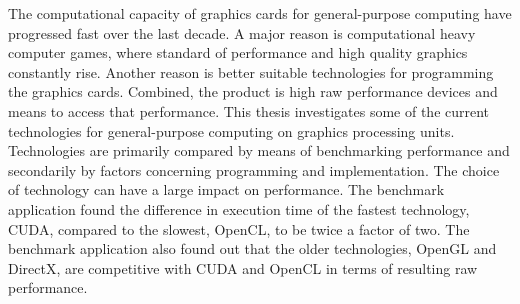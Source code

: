 The computational capacity of graphics cards for general-purpose computing have progressed fast over the last decade. A major reason is computational heavy computer games, where standard of performance and high quality graphics constantly rise. Another reason is better suitable technologies for programming the graphics cards. Combined, the product is high raw performance devices and means to access that performance. This thesis investigates some of the current technologies for general-purpose computing on graphics processing units. Technologies are primarily compared by means of benchmarking performance and secondarily by factors concerning programming and implementation. The choice of technology can have a large impact on performance. The benchmark application found the difference in execution time of the fastest technology, CUDA, compared to the slowest, OpenCL, to be twice a factor of two. The benchmark application also found out that the older technologies, OpenGL and DirectX, are competitive with CUDA and OpenCL in terms of resulting raw performance.%